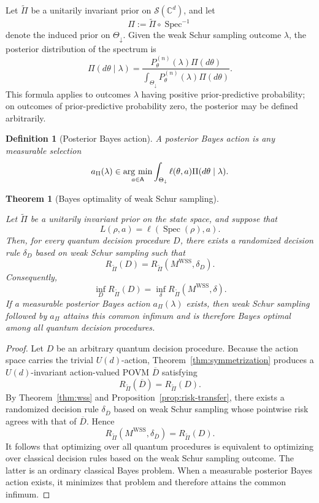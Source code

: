 \documentclass{article}
\newtheorem{theorem}{Theorem}[section]
\newtheorem{definition}{Definition}
\theoremstyle{named}
\theoremstyle{named1}
\newcommand{\spec}{\operatorname{Spec}}
\newcommand{\argmin}{\mathop{\rm arg~min}\limits}
\theoremstyle{plain}
\theoremstyle{remark}
\begin{document}
Let \(\widetilde\Pi\) be a unitarily invariant prior on
\(\mathcal S(\mathbb C^d)\), and let
\[
\Pi
:=
\widetilde\Pi\circ\spec^{-1}
\]
denote the induced prior on \(\Theta_{\downarrow}\).
Given the weak Schur sampling outcome \(\lambda\), the posterior
distribution of the spectrum is
\[
\Pi(d\theta\mid\lambda)
=
\frac{P_\theta^{(n)}(\lambda)\Pi(d\theta)}
{\int_{\Theta_{\downarrow}}
P_\theta^{(n)}(\lambda)\Pi(d\theta)}.
\]
This formula applies to outcomes \(\lambda\) having positive
prior-predictive probability; on outcomes of prior-predictive
probability zero, the posterior may be defined arbitrarily.


\begin{definition}[Posterior Bayes action]
A posterior Bayes action is any measurable selection
\[
    a_\Pi(\lambda)
    \in\argmin_{a\in\mathsf A}
      \int_{\Theta_{\downarrow}}\ell(\theta,a)
      \Pi(d\theta\mid\lambda).
\]
\end{definition}



\begin{theorem}[Bayes optimality of weak Schur sampling]\label{thm:WSS_bayes-optimal}

Let \(\widetilde\Pi\) be a unitarily invariant prior on the state
space, and suppose that
\[
L(\rho,a)=\ell(\spec(\rho),a).
\]
Then, for every quantum decision procedure \(D\), there
exists a randomized decision rule \(\delta_D\) based on weak Schur
sampling such that
\[
R_{\widetilde\Pi}(D)
=
R_{\widetilde\Pi}(M^{\mathrm{WSS}},\delta_D).
\]
Consequently,
\[
\inf_D R_{\widetilde\Pi}(D)
=
\inf_\delta
R_{\widetilde\Pi}(M^{\mathrm{WSS}},\delta).
\]
If a measurable posterior Bayes action \(a_\Pi(\lambda)\) exists, then
weak Schur sampling followed by \(a_\Pi\) attains this common infimum
and is therefore Bayes optimal among all quantum decision
procedures.
\end{theorem}

\begin{proof}
Let \(D\) be an arbitrary quantum decision procedure.
Because the action space carries the trivial \(U(d)\)-action,
Theorem~\ref{thm:symmetrization} produces a \(U(d)\)-invariant
action-valued POVM \(\overline D\) satisfying
\[
R_{\widetilde\Pi}(\overline D)
=
R_{\widetilde\Pi}(D).
\]
By Theorem~\ref{thm:wss} and
Proposition~\ref{prop:risk-transfer}, there exists a randomized
decision rule \(\delta_{\overline D}\) based on weak Schur sampling
whose pointwise risk agrees with that of \(\overline D\). Hence
\[
R_{\widetilde\Pi}
(M^{\mathrm{WSS}},\delta_{\overline D})
=
R_{\widetilde\Pi}(D).
\]
It follows that optimizing over all quantum procedures is
equivalent to optimizing over classical decision rules based on the
weak Schur sampling outcome. The latter is an ordinary classical Bayes problem. When a measurable
posterior Bayes action exists, it minimizes that problem and
therefore attains the common infimum.
\end{proof}
\end{document}
